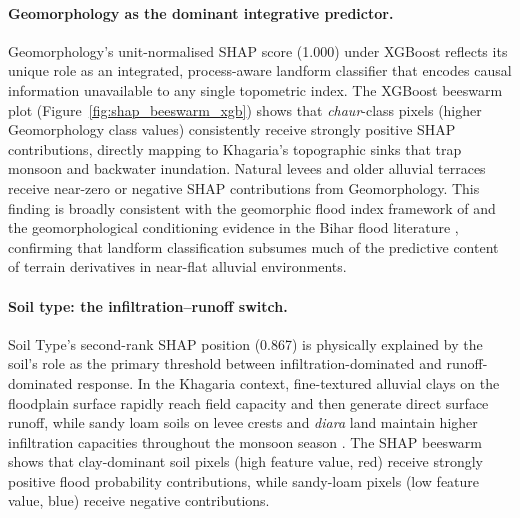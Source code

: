 \documentclass[12pt, a4paper]{article}
\begin{document}
\paragraph{Geomorphology as the dominant integrative predictor.}
Geomorphology's unit-normalised SHAP score (1.000) under XGBoost reflects its unique role as an integrated, process-aware landform classifier that encodes causal information unavailable to any single topometric index.  The XGBoost beeswarm plot (Figure~\ref{fig:shap_beeswarm_xgb}) shows that \textit{chaur}-class pixels (higher Geomorphology class values) consistently receive strongly positive SHAP contributions, directly mapping to Khagaria's topographic sinks that trap monsoon and backwater inundation.  Natural levees and older alluvial terraces receive near-zero or negative SHAP contributions from Geomorphology.  This finding is broadly consistent with the geomorphic flood index framework of \citet{samela2017} and the geomorphological conditioning evidence in the Bihar flood literature \citep{sinha2008}, confirming that landform classification subsumes much of the predictive content of terrain derivatives in near-flat alluvial environments.

\paragraph{Soil type: the infiltration--runoff switch.}
Soil Type's second-rank SHAP position (0.867) is physically explained by the soil's role as the primary threshold between infiltration-dominated and runoff-dominated response.  In the Khagaria context, fine-textured alluvial clays on the floodplain surface rapidly reach field capacity and then generate direct surface runoff, while sandy loam soils on levee crests and \textit{diara} land maintain higher infiltration capacities throughout the monsoon season \citep{NBSSLUPbihar2020}.  The SHAP beeswarm shows that clay-dominant soil pixels (high feature value, red) receive strongly positive flood probability contributions, while sandy-loam pixels (low feature value, blue) receive negative contributions.
\end{document}
